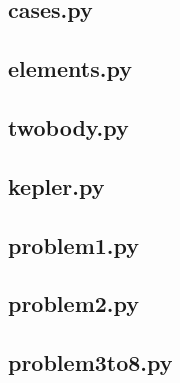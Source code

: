 \subsection{cases.py}

\clearpage

\subsection{elements.py}

\clearpage

\subsection{twobody.py}

\clearpage

\subsection{kepler.py}

\clearpage

\subsection{problem1.py}


\subsection{problem2.py}


\subsection{problem3to8.py}

